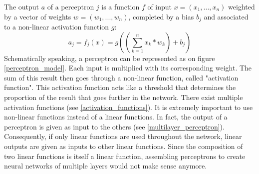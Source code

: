 The output $a$ of a perceptron $j$ is a function $f$ of input $x=(x_{1}, ..., x_{n})$ weighted by a vector of weights $w_{}=(w_{1}, ..., w_{n})$, completed by a bias $b_{j}$ and associated to a non-linear activation function $g$:
\begin{equation}
\label{perceptron_equation}
a_{j} = f_{j}(x) = g((\sum_{k=1}^{n} x_{k} * w_{k}) + b_{j})
\end{equation}
Schematically speaking, a perceptron can be represented as on figure \ref{perceptron_model}. Each input is multiplied with its corresponding weight. The sum of this result then goes through a non-linear function, called "activation function". This activation function acts like a threshold that determines the proportion of the result that goes further in the network. There exist multiple activation functions (see \ref{activation_functions}). It is extremely important to use non-linear functions instead of a linear functions. In fact, the output of a perceptron is given as input to the others (see \ref{multilayer_perceptron}). Consequently, if only linear functions are used throughout the network, linear outputs are given as inputs to other linear functions. Since the composition of two linear functions is itself a linear function, assembling perceptrons to create neural networks of multiple layers would not make sense anymore.





